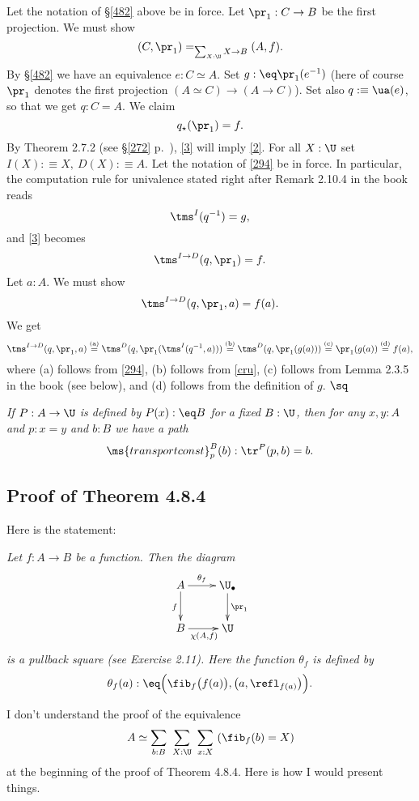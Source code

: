 \documentclass[12pt]{article}
\begin{document}
Let the notation of \S\ref{482} above be in force. Let $\pr_1:C\to B$ be the first projection. We must show 
\begin{equation}\label{2}
(C,\pr_1)=_{\sum_{X:\U}X\to B}(A,f).
\end{equation} 
By \S\ref{482} we have an equivalence $e:C\simeq A$. Set $g:\eq\pr_1(e^{-1})$ (here of course $\pr_1$ denotes the first projection $(A\simeq C)\to(A\to C)$). Set also $q:\equiv\ua(e)$, so that we get $q:C=A$. We claim 
\begin{equation}\label{3}
q_\star(\pr_1)=f.
\end{equation} 
By Theorem 2.7.2 (see \S\ref{272} p.~\pageref{272}), \eqref{3} will imply \eqref{2}. For all $X:\U$ set $I(X):\equiv X,\ D(X):\equiv A$. Let the notation of \eqref{294} be in force. In particular, the computation rule for univalence stated right after Remark 2.10.4 in the book reads 
\begin{equation}\label{cru}
\tms^I(q^{-1})=g,
\end{equation}
and \eqref{3} becomes 
$$
\tms^{I\to D}(q,\pr_1)=f.
$$ 
Let $a:A$. We must show 
$$
\tms^{I\to D}(q,\pr_1,a)=f(a).
$$ 
We get 
$$
\tms^{I\to D}(q,\pr_1,a)\overset{\text{(a)}}=\tms^D(q,\pr_1(\tms^I(q^{-1},a)))\overset{\text{(b)}}=\tms^D(q,\pr_1(g(a)))\overset{\text{(c)}}=\pr_1(g(a))\overset{\text{(d)}}=f(a),
$$ 
where (a) follows from \eqref{294}, (b) follows from \eqref{cru}, (c) follows from Lemma 2.3.5 in the book (see below), and (d) follows from the definition of $g$. $\sq$

\nn{} \emph{If $P:A\to\U$ is defined by $P(x):\eq B$ for a fixed $B:\U$, then for any $x,y:A$ and $p:x=y$ and $b:B$ we have a path}
$$
\ms{transportconst}^B_p(b):\tr^P(p,b)=b.
$$


\subsection{Proof of Theorem 4.8.4}

Here is the statement:

\nn\emph{Let $f:A\to B$ be a function. Then the diagram
$$
\xymatrix{
A\ar[r]^-{\theta_f}\ar[d]_{f}&\U_\bullet\ar[d]^{\pr_1}\\
B\ar[r]_{\chi(A,f)} &\U}
$$ 
is a pullback square (see Exercise 2.11). Here the function $\theta_f$ is defined by}
$$
\theta_f(a):\eq\Big(\fib_f\big(f(a)\big),\big(a,\refl_{f(a)}\big)\Big).
$$

I don't understand the proof of the equivalence 
\begin{equation}\label{484}
A\simeq\sum_{b:B}\ \sum_{X:\U}\ \sum_{x:X}\ (\fib_f(b)=X)
\end{equation}
at the beginning of the proof of Theorem 4.8.4. Here is how I would present things. 
\end{document}
